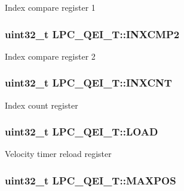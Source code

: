 Index compare register 1 \hypertarget{structLPC__QEI__T_a19ba8a85129824ec0259b6733baff660}{
\subsubsection[{I\-N\-X\-C\-M\-P2}]{ uint32\-\_\-t L\-P\-C\-\_\-\-Q\-E\-I\-\_\-\-T\-::\-I\-N\-X\-C\-M\-P2}}\label{structLPC__QEI__T_a19ba8a85129824ec0259b6733baff660}
Index compare register 2 \hypertarget{structLPC__QEI__T_ae5f756b6037664715b3157f6b6953e42}{
\subsubsection[{I\-N\-X\-C\-N\-T}]{ uint32\-\_\-t L\-P\-C\-\_\-\-Q\-E\-I\-\_\-\-T\-::\-I\-N\-X\-C\-N\-T}}\label{structLPC__QEI__T_ae5f756b6037664715b3157f6b6953e42}
Index count register \hypertarget{structLPC__QEI__T_aab13bc1fd1ecc6539d985d00a2beb756}{
\subsubsection[{L\-O\-A\-D}]{ uint32\-\_\-t L\-P\-C\-\_\-\-Q\-E\-I\-\_\-\-T\-::\-L\-O\-A\-D}}\label{structLPC__QEI__T_aab13bc1fd1ecc6539d985d00a2beb756}
Velocity timer reload register \hypertarget{structLPC__QEI__T_acaf54ed95adb4553f8be314b509f786b}{
\subsubsection[{M\-A\-X\-P\-O\-S}]{ uint32\-\_\-t L\-P\-C\-\_\-\-Q\-E\-I\-\_\-\-T\-::\-M\-A\-X\-P\-O\-S}}\label{structLPC__QEI__T_acaf54ed95adb4553f8be314b509f786b}
